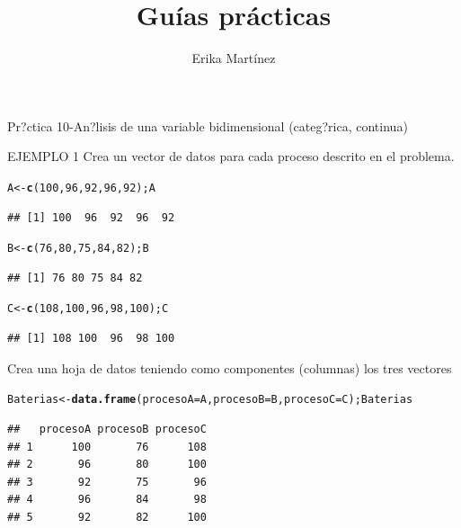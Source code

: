 \documentclass[10pt,a4paper]{article}\usepackage[]{graphicx}\usepackage[]{color}
\author{Erika Martínez}
\title{Guías prácticas}
\makeatletter
\newcommand{\hlnum}[1]{\textcolor[rgb]{0.686,0.059,0.569}{#1}}%
\newcommand{\hlstd}[1]{\textcolor[rgb]{0.345,0.345,0.345}{#1}}%
\newcommand{\hlkwb}[1]{\textcolor[rgb]{0.69,0.353,0.396}{#1}}%
\newcommand{\hlkwc}[1]{\textcolor[rgb]{0.333,0.667,0.333}{#1}}%
\newcommand{\hlkwd}[1]{\textcolor[rgb]{0.737,0.353,0.396}{\textbf{#1}}}%
\newenvironment{kframe}{%
 \def\at@end@of@kframe{}%
 \ifinner\ifhmode%
  \def\at@end@of@kframe{\end{minipage}}%
  \begin{minipage}{\columnwidth}%
 \fi\fi%
 \def\FrameCommand##1{\hskip\@totalleftmargin \hskip-\fboxsep
 \colorbox{shadecolor}{##1}\hskip-\fboxsep
     \hskip-\linewidth \hskip-\@totalleftmargin \hskip\columnwidth}%
 \MakeFramed {\advance\hsize-\width
   \@totalleftmargin\z@ \linewidth\hsize
   \@setminipage}}%
 {\par\unskip\endMakeFramed%
 \at@end@of@kframe}
\newenvironment{knitrout}{}{} %
\makeatother
\begin{document}
\maketitle
\newpage

Pr?ctica 10-An?lisis de una variable bidimensional (categ?rica, continua)

EJEMPLO 1
Crea un vector de datos para cada proceso descrito en el problema. 
\begin{knitrout}
\color{fgcolor}\begin{kframe}
\begin{alltt}
\hlstd{A} \hlkwb{<-} \hlkwd{c}\hlstd{(}\hlnum{100}\hlstd{,}\hlnum{96}\hlstd{,}\hlnum{92}\hlstd{,}\hlnum{96}\hlstd{,}\hlnum{92}\hlstd{); A}
\end{alltt}
\begin{verbatim}
## [1] 100  96  92  96  92
\end{verbatim}
\begin{alltt}
\hlstd{B} \hlkwb{<-} \hlkwd{c}\hlstd{(}\hlnum{76}\hlstd{,}\hlnum{80}\hlstd{,}\hlnum{75}\hlstd{,}\hlnum{84}\hlstd{,}\hlnum{82}\hlstd{); B}
\end{alltt}
\begin{verbatim}
## [1] 76 80 75 84 82
\end{verbatim}
\begin{alltt}
\hlstd{C} \hlkwb{<-} \hlkwd{c}\hlstd{(}\hlnum{108}\hlstd{,}\hlnum{100}\hlstd{,}\hlnum{96}\hlstd{,}\hlnum{98}\hlstd{,}\hlnum{100}\hlstd{); C}
\end{alltt}
\begin{verbatim}
## [1] 108 100  96  98 100
\end{verbatim}
\end{kframe}
\end{knitrout}


Crea una hoja de datos teniendo como componentes (columnas) los tres vectores
\begin{knitrout}
\color{fgcolor}\begin{kframe}
\begin{alltt}
\hlstd{Baterias} \hlkwb{<-} \hlkwd{data.frame}\hlstd{(}\hlkwc{procesoA}\hlstd{=A,} \hlkwc{procesoB}\hlstd{=B,} \hlkwc{procesoC}\hlstd{=C); Baterias}
\end{alltt}
\begin{verbatim}
##   procesoA procesoB procesoC
## 1      100       76      108
## 2       96       80      100
## 3       92       75       96
## 4       96       84       98
## 5       92       82      100
\end{verbatim}
\end{kframe}
\end{knitrout}
\end{document}
